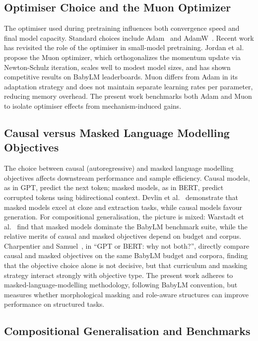 \subsection{Optimiser Choice and the Muon Optimizer}

The optimiser used during pretraining influences both convergence speed and final model capacity. Standard choices include Adam~\cite{Kingma2015Adam} and AdamW~\cite{Loshchilov2019AdamW}. Recent work has revisited the role of the optimiser in small-model pretraining. Jordan et al.~\cite{Jordan2024Muon} propose the Muon optimizer, which orthogonalizes the momentum update via Newton-Schulz iteration, scales well to modest model sizes, and has shown competitive results on BabyLM leaderboards. Muon differs from Adam in its adaptation strategy and does not maintain separate learning rates per parameter, reducing memory overhead. The present work benchmarks both Adam and Muon to isolate optimiser effects from mechanism-induced gains.

\subsection{Causal versus Masked Language Modelling Objectives}

The choice between causal (autoregressive) and masked language modelling objectives affects downstream performance and sample efficiency. Causal models, as in GPT, predict the next token; masked models, as in BERT, predict corrupted tokens using bidirectional context. Devlin et al.~\cite{Devlin2019} demonstrate that masked models excel at cloze and extraction tasks, while causal models favour generation. For compositional generalisation, the picture is mixed: Warstadt et al.~\cite{Warstadt2023} find that masked models dominate the BabyLM benchmark suite, while the relative merits of causal and masked objectives depend on budget and corpus. Charpentier and Samuel~\cite{CharpentierSamuel2024}, in ``GPT or BERT: why not both?'', directly compare causal and masked objectives on the same BabyLM budget and corpora, finding that the objective choice alone is not decisive, but that curriculum and masking strategy interact strongly with objective type. The present work adheres to masked-language-modelling methodology, following BabyLM convention, but measures whether morphological masking and role-aware structures can improve performance on structured tasks.

\subsection{Compositional Generalisation and Benchmarks}

